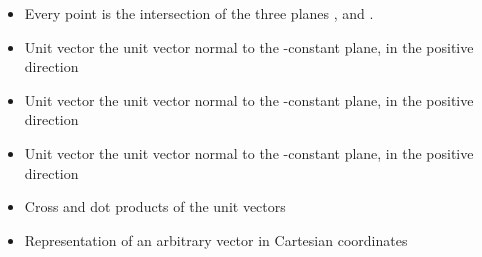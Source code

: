 \ELhold


\begin{ELunit}


\begin{itemize}
\item
  Every point  is the intersection of the three planes ,  and .
\item
  Unit vector  \ELim{\ELto} the unit vector normal to the -constant plane, in the positive direction
\item
  Unit vector  \ELim{\ELto} the unit vector normal to the -constant plane, in the positive direction
\item
  Unit vector  \ELim{\ELto} the unit vector normal to the -constant plane, in the positive direction
\item
  Cross and dot products of the unit vectors
\end{itemize}




\end{ELunit}

\begin{ELjoin}

\begin{itemize}
\tightlist
\item
  Representation of an arbitrary vector  in Cartesian coordinates
\end{itemize}

\begin{ELimportant}{}


\end{ELimportant}

\end{ELjoin}

